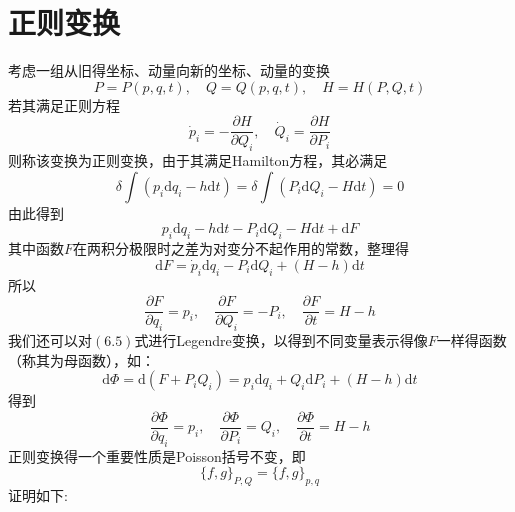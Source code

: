 \section{正则变换}
考虑一组从旧得坐标、动量向新的坐标、动量的变换
\begin{equation}
    P=P(p,q,t),\quad Q=Q(p,q,t),\quad H=H(P,Q,t)
\end{equation}
若其满足正则方程
\begin{equation}
    \dot{p}_i=-\frac{\partial H}{\partial Q_i},\quad \dot{Q}_i=\frac{\partial H}{\partial P_i}
\end{equation}
则称该变换为正则变换，由于其满足Hamilton方程，其必满足
\begin{equation}
    \delta\int(p_i\mathrm{d}q_i-h\mathrm{d}t)=\delta\int(P_i\mathrm{d}Q_i-H\mathrm{d}t)=0
\end{equation}
由此得到
\begin{equation}
    p_i\mathrm{d}q_i-h\mathrm{d}t-P_i\mathrm{d}Q_i-H\mathrm{d}t+\mathrm{d}F
\end{equation}
其中函数$F$在两积分极限时之差为对变分不起作用的常数，整理得
\begin{equation}
    \mathrm{d}F=\dot{p}_i\mathrm{d}q_i-P_i\mathrm{d}Q_i+(H-h)\mathrm{d}t
\end{equation}
所以
\begin{equation}
    \frac{\partial F}{\partial q_i}=p_i,\quad \frac{\partial F}{\partial Q_i}=-P_i,\quad \frac{\partial F}{\partial t}=H-h
\end{equation}
我们还可以对$(6.5)$式进行Legendre变换，以得到不同变量表示得像$F$一样得函数（称其为母函数），如：
\begin{equation}
    \mathrm{d}\varPhi=\mathrm{d}(F+P_iQ_i)=p_i\mathrm{d}q_i+Q_i\mathrm{d}P_i+(H-h)\mathrm{d}t
\end{equation}
得到
\begin{equation}
    \frac{\partial\varPhi}{\partial q_i}=p_i,\quad \frac{\partial\varPhi}{\partial P_i}=Q_i,
    \quad \frac{\partial\varPhi}{\partial t}=H-h 
\end{equation}
正则变换得一个重要性质是Poisson括号不变，即
\begin{equation}
    \{f,g\}_{P,Q}=\{f,g\}_{p,q}
\end{equation}
证明如下:
